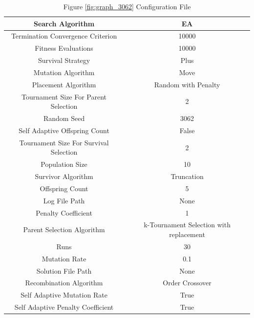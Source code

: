 \documentclass{standalone}
\begin{document}
\begin{table}[!htb]
	\centering
	\caption{Figure \ref{fig:graph_3062} Configuration File}
	\label{tab:graph_3062}
	\begin{tabular}{| c | c |}
		\hline
		Search Algorithm		& EA		 \\
		\hline
		Termination Convergence Criterion		& 10000		 \\
		\hline
		Fitness Evaluations		& 10000		 \\
		\hline
		Survival Strategy		& Plus		 \\
		\hline
		Mutation Algorithm		& Move		 \\
		\hline
		Placement Algorithm		& Random with Penalty		 \\
		\hline
		Tournament Size For Parent Selection		& 2		 \\
		\hline
		Random Seed		& 3062		 \\
		\hline
		Self Adaptive Offspring Count		& False		 \\
		\hline
		Tournament Size For Survival Selection		& 2		 \\
		\hline
		Population Size		& 10		 \\
		\hline
		Survivor Algorithm		& Truncation		 \\
		\hline
		Offspring Count		& 5		 \\
		\hline
		Log File Path		& None		 \\
		\hline
		Penalty Coefficient		& 1		 \\
		\hline
		Parent Selection Algorithm		& k-Tournament Selection with replacement		 \\
		\hline
		Runs		& 30		 \\
		\hline
		Mutation Rate		& 0.1		 \\
		\hline
		Solution File Path		& None		 \\
		\hline
		Recombination Algorithm		& Order Crossover		 \\
		\hline
		Self Adaptive Mutation Rate		& True		 \\
		\hline
		Self Adaptive Penalty Coefficient		& True		 \\
		\hline
	\end{tabular}
\end{table}
\end{document}
